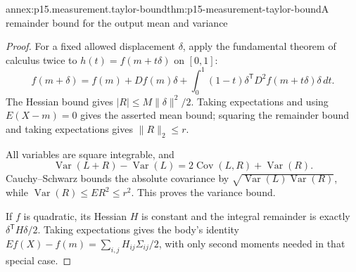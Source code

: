 \begin{annexitem}{annex:p15.measurement.taylor-bound}{thm:p15-measurement-taylor-bound}{A remainder bound for the output mean and variance}
\begin{proof}
For a fixed allowed displacement \(\delta\), apply the fundamental theorem
of calculus twice to \(h(t)=f(m+t\delta)\) on \([0,1]\):
\[
 f(m+\delta)=f(m)+Df(m)\delta+
  \int_0^1(1-t)\delta^{\mathsf T}D^2f(m+t\delta)\delta\,dt.
\]
The Hessian bound gives \(|R|\leq M\|\delta\|^2/2\).
Taking expectations and using \(E(X-m)=0\) gives the asserted mean bound;
squaring the remainder bound and taking expectations gives \(\|R\|_2\leq r\).

All variables are square integrable, and
\[
 \operatorname{Var}(L+R)-\operatorname{Var}(L)
 =2\operatorname{Cov}(L,R)+\operatorname{Var}(R).
\]
Cauchy--Schwarz bounds the absolute covariance by
\(\sqrt{\operatorname{Var}(L)\operatorname{Var}(R)}\), while
\(\operatorname{Var}(R)\leq ER^2\leq r^2\).
This proves the variance bound.

If \(f\) is quadratic, its Hessian \(H\) is constant and the integral
remainder is exactly \(\delta^{\mathsf T}H\delta/2\). Taking expectations
gives the body's identity
\(Ef(X)-f(m)=\sum_{i,j}H_{ij}\Sigma_{ij}/2\), with only second moments
needed in that special case.
\end{proof}
\end{annexitem}

